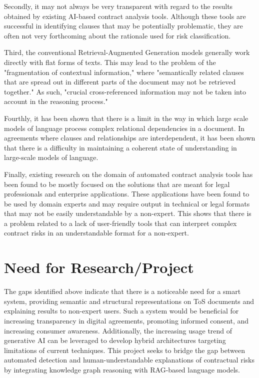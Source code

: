 Secondly, it may not always be very transparent with regard to the results obtained by existing AI-based contract analysis tools.
Although these tools are successful in identifying clauses that may be potentially problematic, they are often not
very forthcoming about the rationale used for risk classification.

Third, the conventional Retrieval-Augmented Generation models generally work directly with flat forms of texts.
This may lead to the problem of the "fragmentation of contextual information," where "semantically related clauses
that are spread out in different parts of the document may not be retrieved together." As such, "crucial cross-referenced
information may not be taken into account in the reasoning process."

Fourthly, it has been shown that there is a limit in the way in which large scale models of language process complex relational dependencies in a document.
In agreements where clauses and relationships are interdependent, it has been shown that there is a difficulty in maintaining a coherent state of understanding in large-scale models of language.

Finally, existing research on the domain of automated contract analysis tools has been found to be mostly focused on
the solutions that are meant for legal professionals and enterprise applications.
These applications have been found to be used by domain experts and may require output in technical or legal
formats that may not be easily understandable by a non-expert.
This shows that there is a problem related to a lack of user-friendly tools that can interpret complex contract
risks in an understandable format for a non-expert.



\section{Need for Research/Project}
The gaps identified above indicate that there is a noticeable need
for a smart system, providing semantic and structural representations
on ToS documents and explaining results to non-expert users. Such a
system would be beneficial for increasing transparency in digital
agreements, promoting informed consent, and increasing consumer
awareness. Additionally, the increasing usage trend of generative AI
can be leveraged to develop hybrid architectures targeting
limitations of current techniques. This project seeks to bridge the
gap between automated detection and human-understandable explanations
of contractual risks by integrating knowledge graph reasoning with
RAG-based language models.

